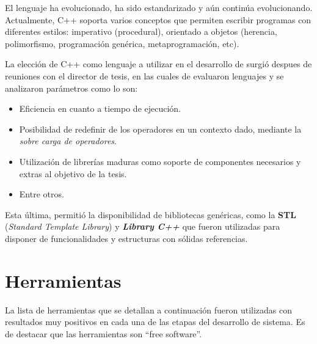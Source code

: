 El lenguaje ha evolucionado, ha sido estandarizado y aún continúa evolucionando. Actualmente, C++ soporta varios conceptos que permiten escribir programas con diferentes estilos: imperativo (procedural), orientado a objetos (herencia, polimorfismo, programación genérica, metaprogramación, etc).

La elección de C++ como lenguaje a utilizar en el desarrollo de \maggen surgió despues de reuniones con el director de tesis, en las cuales de evaluaron lenguajes y se analizaron parámetros como lo son:

\begin{itemize}
\item Eficiencia en cuanto a tiempo de ejecución.

\item Posibilidad de redefinir de los operadores en un contexto dado, mediante la \textit{sobre carga de operadores}.

\item Utilización de librerías maduras como soporte de componentes necesarios y extras al objetivo de la tesis.

\item Entre otros.
\end{itemize}

Esta última, permitió la disponibilidad de bibliotecas genéricas, como la \textbf{STL} (\textit{Standard Template Library}) y \boost \textbf{\textit{Library C++}} que fueron utilizadas para disponer de funcionalidades y estructuras con sólidas referencias.

\section{Herramientas}
La lista de herramientas que se detallan a continuación fueron utilizadas con resultados muy positivos en cada una de las etapas del desarrollo de sistema. Es de destacar que las herramientas son ``free software''.

